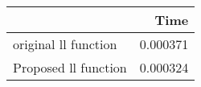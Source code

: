 \begin{tabular}{lr}
\toprule
{} &      Time \\
\midrule
original ll function &  0.000371 \\
Proposed ll function &  0.000324 \\
\bottomrule
\end{tabular}
